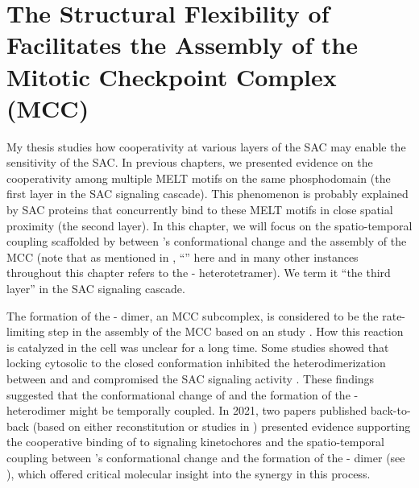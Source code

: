 \chapter{The Structural Flexibility of  Facilitates the Assembly of the Mitotic Checkpoint Complex (MCC)}
\label{chpt:4}

My thesis studies how cooperativity at various layers of the SAC may enable the sensitivity of the SAC. In previous chapters, we presented evidence on the cooperativity among multiple MELT motifs on the same  phosphodomain (the first layer in the SAC signaling cascade). This phenomenon is probably explained by SAC proteins that concurrently bind to these MELT motifs in close spatial proximity (the second layer). In this chapter, we will focus on the spatio-temporal coupling scaffolded by  between 's conformational change and the assembly of the MCC \cite{BUB1-CDC20-MAD1,Tripartite} (note that as mentioned in , ``'' here and in many other instances throughout this chapter refers to the - heterotetramer). We term it ``the third layer'' in the SAC signaling cascade. %

The formation of the - dimer, an MCC subcomplex, is considered to be the rate-limiting step in the assembly of the MCC based on an  study \cite{Faesen2017}. How this reaction is catalyzed in the cell was unclear for a long time. Some studies showed that locking cytosolic  to the closed conformation inhibited the heterodimerization between  and  and compromised the SAC signaling activity \cite{Ma+Poon2016,Ma+Poon2018,Kim2018}. These findings suggested that the conformational change of  and the formation of the - heterodimer might be temporally coupled. In 2021, two papers published back-to-back (based on either  reconstitution \cite{BUB1-CDC20-MAD1} or studies in  \cite{Tripartite}) presented evidence supporting the cooperative binding of  to signaling kinetochores and the spatio-temporal coupling between 's conformational change and the formation of the - dimer (see ), which offered critical molecular insight into the synergy in this process.

